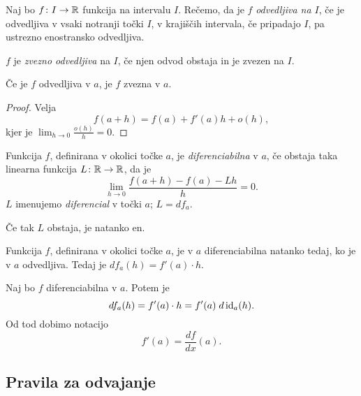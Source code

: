 \documentclass[12pt, a4paper]{article}
\begin{document}
\begin{definicija}
Naj bo $f\colon I\to\mathbb{R}$ funkcija na intervalu $I$. Rečemo, da je $f$ \emph{odvedljiva na $I$}, če je odvedljiva v vsaki notranji točki $I$, v krajiščih intervala, če pripadajo $I$, pa ustrezno enostransko odvedljiva.
\end{definicija}

\begin{definicija}
$f$ je \emph{zvezno odvedljiva} na $I$, če njen odvod obstaja in je zvezen na $I$.
\end{definicija}

\begin{trditev}
Če je $f$ odvedljiva v $a$, je $f$ zvezna v $a$.
\end{trditev}

\begin{proof}
Velja
\[
f(a+h)=f(a)+f'(a)h+o(h),
\]
kjer je $\displaystyle\lim_{h\to 0}\frac{o(h)}{h}=0$.
\end{proof}

\begin{definicija}
Funkcija $f$, definirana v okolici točke $a$, je \emph{diferenciabilna} v $a$, če obstaja taka linearna funkcija $L\colon\mathbb{R}\to\mathbb{R}$, da je
\[
\lim_{h\to 0}\frac{f(a+h)-f(a)-Lh}{h}=0.
\]
$L$ imenujemo \emph{diferencial} v točki $a$; $L=df_a$.
\end{definicija}

\begin{opomba}
Če tak $L$ obstaja, je natanko en.
\end{opomba}

\begin{trditev}
Funkcija $f$, definirana v okolici točke $a$, je v $a$ diferenciabilna natanko tedaj, ko je v $a$ odvedljiva. Tedaj je $df_a(h)=f'(a)\cdot h$.
\end{trditev}

\obvs

\begin{opomba}
Naj bo $f$ diferenciabilna v $a$. Potem je
\[
df_a(h)=f'(a)\cdot h=f'(a)\;d\operatorname{id}_a(h).
\]
Od tod dobimo notacijo
\[
f'(a)=\frac{df}{dx}(a).
\]
\end{opomba}

\newpage

\subsection{Pravila za odvajanje}
\end{document}
